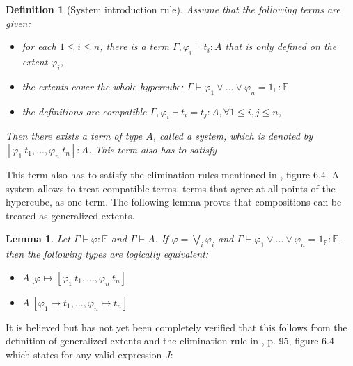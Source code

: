 \documentclass[12pt,a4paper,twoside,xetex]{book} %
\newcommand{\keyword}[1]{\emph{#1}\index{#1}}
\newtheorem{lemma}[theorem]{Lemma}
\newtheorem{definition}[theorem]{Definition}
\begin{document}
\begin{definition}[System introduction rule]
Assume that the following terms are given: 
\begin{itemize}
\item for each $1 \leq i \leq n$, there is a term  $\Gamma, \varphi_i \vdash 
t_i : A$ that is only defined on the extent $\varphi_i$, 
\item the extents cover the whole hypercube: $\Gamma \vdash \varphi_1 \vee ... 
\vee \varphi_n = 1_{\mathbb{F}} : \mathbb{F}$ 
\item the definitions are compatible $\Gamma, \varphi_i \vdash t_i = t_j : A, 
\forall 1\leq i,j\leq n$, 
\end{itemize}
Then there exists a term of type $A$, called a \keyword{system}, which  is denoted 
by $[\varphi_1 \  t_1, ..., \varphi_n \ t_n]: A$. This term also has to satisfy
\end{definition}

This term also has to satisfy the elimination rules mentioned in \cite{Huber2016}, figure 6.4.  A system allows to treat compatible terms, terms that agree at all points of the hypercube, as one term. The following lemma proves that compositions can be treated as generalized extents.



\begin{lemma}\label{extentrewrite}
Let $\Gamma \vdash \varphi : \mathbb{F}$ and $\Gamma \vdash A$. If $\varphi = 
\bigvee_i \varphi_i$ and $\Gamma \vdash \varphi_1 \vee ... \vee \varphi_n = 
1_{\mathbb{F}} : \mathbb{F}$, then the following types are logically equivalent: 
\begin{itemize}
\item $A\ [\varphi \mapsto [\varphi_1 \ t_1, ..., \varphi_n \ t_n]$
\item $A\ [\varphi_1 \mapsto t_1, ..., \varphi_n \mapsto t_n]$
\end{itemize}

\end{lemma}

It is believed but has not yet been completely verified that this follows from the definition of generalized extents and the elimination rule in \cite{Huber2016}, p. 95, figure 6.4 which states for any valid expression $J$: 
\begin{prooftree}
\end{prooftree}
\end{document}
